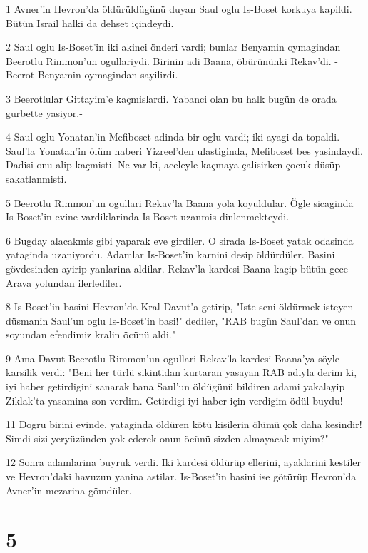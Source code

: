\par 1 Avner'in Hevron'da öldürüldügünü duyan Saul oglu Is-Boset korkuya kapildi. Bütün Israil halki da dehset içindeydi.
\par 2 Saul oglu Is-Boset'in iki akinci önderi vardi; bunlar Benyamin oymagindan Beerotlu Rimmon'un ogullariydi. Birinin adi Baana, öbürününki Rekav'di. -Beerot Benyamin oymagindan sayilirdi.
\par 3 Beerotlular Gittayim'e kaçmislardi. Yabanci olan bu halk bugün de orada gurbette yasiyor.-
\par 4 Saul oglu Yonatan'in Mefiboset adinda bir oglu vardi; iki ayagi da topaldi. Saul'la Yonatan'in ölüm haberi Yizreel'den ulastiginda, Mefiboset bes yasindaydi. Dadisi onu alip kaçmisti. Ne var ki, aceleyle kaçmaya çalisirken çocuk düsüp sakatlanmisti.
\par 5 Beerotlu Rimmon'un ogullari Rekav'la Baana yola koyuldular. Ögle sicaginda Is-Boset'in evine vardiklarinda Is-Boset uzanmis dinlenmekteydi.
\par 6 Bugday alacakmis gibi yaparak eve girdiler. O sirada Is-Boset yatak odasinda yataginda uzaniyordu. Adamlar Is-Boset'in karnini desip öldürdüler. Basini gövdesinden ayirip yanlarina aldilar. Rekav'la kardesi Baana kaçip bütün gece Arava yolundan ilerlediler.
\par 8 Is-Boset'in basini Hevron'da Kral Davut'a getirip, "Iste seni öldürmek isteyen düsmanin Saul'un oglu Is-Boset'in basi!" dediler, "RAB bugün Saul'dan ve onun soyundan efendimiz kralin öcünü aldi."
\par 9 Ama Davut Beerotlu Rimmon'un ogullari Rekav'la kardesi Baana'ya söyle karsilik verdi: "Beni her türlü sikintidan kurtaran yasayan RAB adiyla derim ki, iyi haber getirdigini sanarak bana Saul'un öldügünü bildiren adami yakalayip Ziklak'ta yasamina son verdim. Getirdigi iyi haber için verdigim ödül buydu!
\par 11 Dogru birini evinde, yataginda öldüren kötü kisilerin ölümü çok daha kesindir! Simdi sizi yeryüzünden yok ederek onun öcünü sizden almayacak miyim?"
\par 12 Sonra adamlarina buyruk verdi. Iki kardesi öldürüp ellerini, ayaklarini kestiler ve Hevron'daki havuzun yanina astilar. Is-Boset'in basini ise götürüp Hevron'da Avner'in mezarina gömdüler.

\chapter{5}


